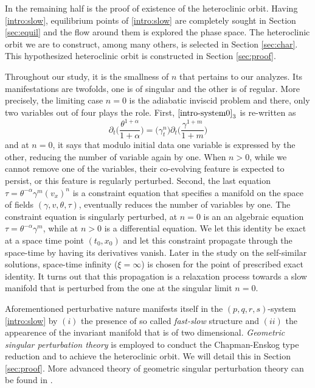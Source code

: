 \documentclass[a4paper,11pt]{article}
\theoremstyle{remark}
\begin{document}
In the remaining half is the proof of existence of the heteroclinic orbit. Having \eqref{intro:slow}, equilibrium points of \eqref{intro:slow} are completely sought in Section \ref{sec:equil} and the flow around them is explored the phase space. The heteroclinic orbit we are to construct, among many others, is selected in Section \ref{sec:char}. This hypothesized heteroclinic orbit is constructed in Section \ref{sec:proof}.

Throughout our study, it is the smallness of $n$ that pertains to our analyzes. Its manifestations are twofolds, one is of singular and the other is of regular. More precisely, the limiting case $n=0$ is the adiabatic inviscid problem and there, only two variables out of four plays the role. First, $\eqref{intro-system0}_3$ is re-written as
$$ \partial_t\Big(\frac{\theta^{1+\alpha}}{1+\alpha}\Big) = \big(\gamma_t^n\big)\partial_t\Big(\frac{\gamma^{1+m}}{1+m}\Big)$$
and at $n=0$, it says that modulo initial data one variable is expressed by the other, reducing the number of variable again by one. When $n>0$, while we cannot remove one of the variables, their co-evolving feature is expected to persist, or this feature is regularly perturbed. Second, the last equation $\tau=\theta^{-\alpha}\gamma^m(v_x)^n$ is a constraint equation that specifies a manifold on the space of fields $(\gamma,v,\theta,\tau)$, eventually reduces the number of variables by one. The constraint equation is singularly perturbed, at $n=0$ is an an algebraic equation $\tau=\theta^{-\alpha}\gamma^m$, while at $n>0$ is a differential equation. %
We let this identity be exact at a space time point $(t_0,x_0)$ and let this constraint propagate through the space-time by having its derivatives vanish. Later in the study on the self-similar solutions, space-time infinity ($\xi=\infty$) is chosen for the point of prescribed exact identity. It turns out that this propagation is a relaxation process towards a slow manifold that is perturbed from the one at the singular limit $n=0$. %

Aforementioned perturbative nature manifests itself in the $(p,q,r,s)$-system \eqref{intro:slow} by $(i)$ the presence of so called {\it fast-slow} structure and $(ii)$ the appearence of the invariant manifold that is of two dimensional. {\it Geometric singular perturbation theory} is employed to conduct the Chapman-Enskog type reduction and to achieve the heteroclinic orbit. We will detail this in Section \ref{sec:proof}. More advanced theory of geometric singular perturbation theory can be found in \cite{fenichel_persistence_1972,fenichel_geometric_1979,HPS_1977,Sz1991}.
\end{document}
